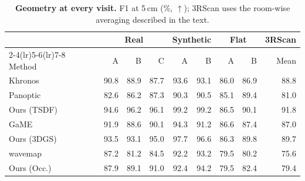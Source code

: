 \begin{table}[t]
\centering
\fontsize{9}{10.3}\selectfont
\setlength{\tabcolsep}{5pt}
\renewcommand{\arraystretch}{1.08}
\begin{tabular}{@{}l*{8}{r}@{}}
\toprule
& \multicolumn{3}{c}{Real} & \multicolumn{2}{c}{Synthetic} & \multicolumn{2}{c}{Flat} & 3RScan \\
\cmidrule(lr){2-4}\cmidrule(lr){5-6}\cmidrule(lr){7-8}
Method & A & B & C & A & B & A & B & Mean \\ \midrule
Khronos & 90.8 & 88.9 & 87.7 & 93.6 & 93.1 & 86.0 & 86.9 & 88.8 \\
Panoptic & 82.6 & 86.2 & 87.3 & 90.3 & 90.5 & 85.1 & 89.4 & 81.0 \\
Ours (TSDF) & 94.6 & 96.2 & 96.1 & 99.2 & 99.2 & 86.5 & 90.1 & 91.8 \\
\midrule
GaME & 91.9 & 88.6 & 90.1 & 94.3 & 91.2 & 86.6 & 87.4 & 87.0 \\
Ours (3DGS) & 93.5 & 93.1 & 95.0 & 97.7 & 96.6 & 86.3 & 89.8 & 89.7 \\
\midrule
wavemap & 87.2 & 81.2 & 84.5 & 92.2 & 93.2 & 79.5 & 80.2 & 75.6 \\
Ours (Occ.) & 87.9 & 89.1 & 91.0 & 92.4 & 94.2 & 79.5 & 82.4 & 79.4 \\
\bottomrule
\end{tabular}
\caption{\textbf{Geometry at every visit.} F1 at 5\,cm (\%, $\uparrow$); 3RScan uses the room-wise averaging described in the text.}
\label{tab:supp_geometry}
\end{table}
